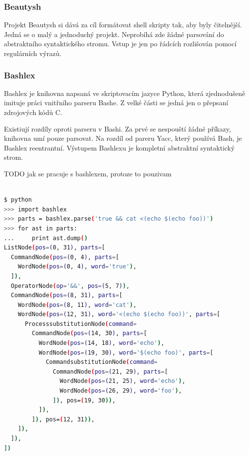 \documentclass[thesis=M,czech]{FITthesis}[2012/06/26]
\begin{document}
%
\subsubsection{Beautysh}

Projekt Beautysh si dává za cíl formátovat shell skripty tak, aby byly čitelnější. Jedná se o malý a jednoduchý projekt. Neprobíhá zde žádné parsování do abstraktního syntaktického stromu. Vstup je jen po řádcích rozlišován pomocí regulárních výrazů.






%
%
%
\subsubsection{Bashlex}\label{sec:bashlex}

Bashlex je knihovna napsaná ve skriptovacím jazyce Python, která zjednodušeně imituje práci vnitřního parseru Bashe. Z velké části se jedná jen o přepsaní zdrojových kódů C.

Existiují rozdíly oproti parseru v Bashi. Za prvé se nespouští žádné příkazy, knihovna umí pouze parsovat. Na rozdíl od pareru Yacc, který používá Bash, je Bashlex reentrantní. Výstupem Bashlexu je kompletní abstraktní syntaktický strom.

TODO jak se pracuje s bashlexem, protoze to pouzivam

\begin{minipage}{\linewidth}
\begin{lstlisting}[language=bash, caption={Výstup z knihovny Bashlex}, label={lst:bashlex}]

$ python
>>> import bashlex
>>> parts = bashlex.parse('true && cat <(echo $(echo foo))')
>>> for ast in parts:
...     print ast.dump()
ListNode(pos=(0, 31), parts=[
  CommandNode(pos=(0, 4), parts=[
    WordNode(pos=(0, 4), word='true'),
  ]),
  OperatorNode(op='&&', pos=(5, 7)),
  CommandNode(pos=(8, 31), parts=[
    WordNode(pos=(8, 11), word='cat'),
    WordNode(pos=(12, 31), word='<(echo $(echo foo))', parts=[
      ProcesssubstitutionNode(command=
        CommandNode(pos=(14, 30), parts=[
          WordNode(pos=(14, 18), word='echo'),
          WordNode(pos=(19, 30), word='$(echo foo)', parts=[
            CommandsubstitutionNode(command=
              CommandNode(pos=(21, 29), parts=[
                WordNode(pos=(21, 25), word='echo'),
                WordNode(pos=(26, 29), word='foo'),
              ]), pos=(19, 30)),
          ]),
        ]), pos=(12, 31)),
    ]),
  ]),
])

\end{lstlisting}
\end{minipage}
\end{document}
